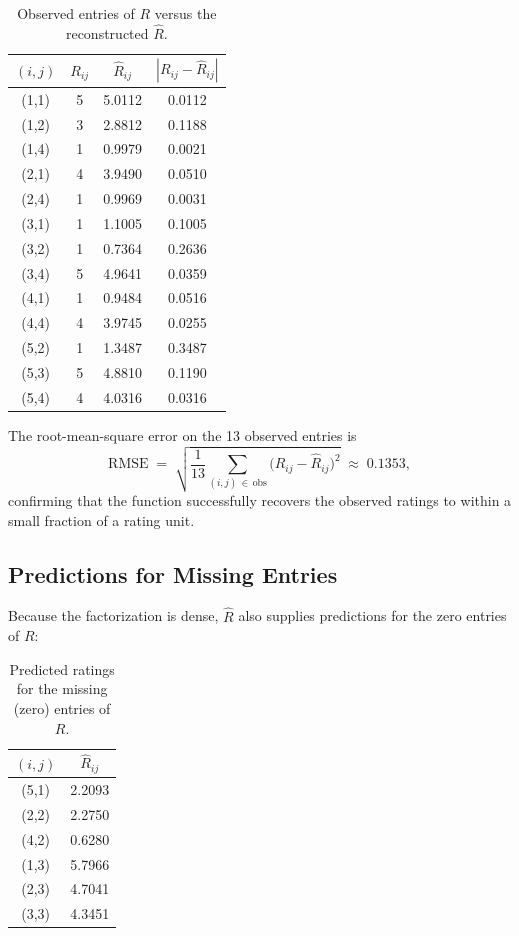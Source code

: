 \documentclass[12pt]{article}
\begin{document}
	\begin{table}[H]
		\centering
		\caption{Observed entries of $R$ versus the reconstructed $\hat{R}$.}\label{tab:obs}
		\begin{tabular}{cccc}
			\toprule
			$(i,j)$ & $R_{ij}$ & $\hat{R}_{ij}$ & $|R_{ij} - \hat{R}_{ij}|$ \\
			\midrule
			(1,1) & 5 & 5.0112 & 0.0112 \\
			(1,2) & 3 & 2.8812 & 0.1188 \\
			(1,4) & 1 & 0.9979 & 0.0021 \\
			(2,1) & 4 & 3.9490 & 0.0510 \\
			(2,4) & 1 & 0.9969 & 0.0031 \\
			(3,1) & 1 & 1.1005 & 0.1005 \\
			(3,2) & 1 & 0.7364 & 0.2636 \\
			(3,4) & 5 & 4.9641 & 0.0359 \\
			(4,1) & 1 & 0.9484 & 0.0516 \\
			(4,4) & 4 & 3.9745 & 0.0255 \\
			(5,2) & 1 & 1.3487 & 0.3487 \\
			(5,3) & 5 & 4.8810 & 0.1190 \\
			(5,4) & 4 & 4.0316 & 0.0316 \\
			\bottomrule
		\end{tabular}
	\end{table}

	The root-mean-square error on the 13 observed entries is
	\begin{equation}
		\text{RMSE} \;=\; \sqrt{\frac{1}{13}\sum_{(i,j)\,\in\,\text{obs}} \bigl( R_{ij} - \hat{R}_{ij} \bigr)^{2}} \;\approx\; 0.1353,
	\end{equation}
	confirming that the function successfully recovers the observed ratings to within a small fraction of a rating unit.

	\subsection{Predictions for Missing Entries}

	Because the factorization is dense, $\hat{R}$ also supplies predictions for the zero entries of $R$:

	\begin{table}[H]
		\centering
		\caption{Predicted ratings for the missing (zero) entries of $R$.}\label{tab:miss}
		\begin{tabular}{cc}
			\toprule
			$(i,j)$ & $\hat{R}_{ij}$ \\
			\midrule
			(5,1) & 2.2093 \\
			(2,2) & 2.2750 \\
			(4,2) & 0.6280 \\
			(1,3) & 5.7966 \\
			(2,3) & 4.7041 \\
			(3,3) & 4.3451 \\
			\bottomrule
		\end{tabular}
	\end{table}
\end{document}
